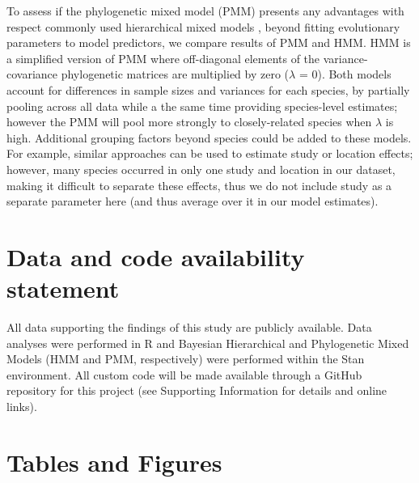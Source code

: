 \documentclass[11pt]{article}
\begin{document}
To assess if the phylogenetic mixed model (PMM) presents any advantages with respect commonly used hierarchical mixed models \citep[HMM; see e.g., ][]{ettinger2020}, beyond fitting evolutionary parameters to model predictors, we compare results of PMM and HMM. HMM is a simplified version of PMM where off-diagonal elements of the variance-covariance phylogenetic matrices are multiplied by zero ($\lambda$ = 0). Both models account for differences in sample sizes and variances for each species, by partially pooling across all data while a the same time providing species-level estimates; however the PMM will pool more strongly to closely-related species when $\lambda$ is high. Additional grouping factors beyond species could be added to these models. For example, similar approaches can be used to estimate study or location effects; however, many species occurred in only one study and location in our dataset, making it difficult to separate these effects, thus we do not include study as a separate parameter here (and thus average over it in our model estimates).





\section*{Data and code availability statement}
All data supporting the findings of this study are publicly available. Data analyses were performed in R and Bayesian Hierarchical and Phylogenetic Mixed Models (HMM and PMM, respectively) were performed within the Stan environment. All custom code will be made available through a GitHub repository for this project (see Supporting Information for details and online links).


\clearpage
\section*{Tables and Figures} 
\end{document}
